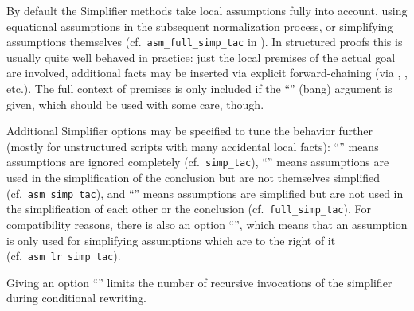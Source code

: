 \begin{isabellebody}
\begin{isamarkuptext}
\begin{descr}
  \end{descr}

  By default the Simplifier methods take local assumptions fully into
  account, using equational assumptions in the subsequent
  normalization process, or simplifying assumptions themselves (cf.\
  \verb|asm_full_simp_tac| in \cite[\S10]{isabelle-ref}).  In
  structured proofs this is usually quite well behaved in practice:
  just the local premises of the actual goal are involved, additional
  facts may be inserted via explicit forward-chaining (via \mbox{}, \mbox{}, \mbox{} etc.).  The full
  context of premises is only included if the ``\isa{{\isacharbang}}'' (bang)
  argument is given, which should be used with some care, though.

  Additional Simplifier options may be specified to tune the behavior
  further (mostly for unstructured scripts with many accidental local
  facts): ``'' means assumptions are ignored
  completely (cf.\ \verb|simp_tac|), ``'' means
  assumptions are used in the simplification of the conclusion but are
  not themselves simplified (cf.\ \verb|asm_simp_tac|), and ``'' means assumptions are simplified but are not used
  in the simplification of each other or the conclusion (cf.\ \verb|full_simp_tac|).  For compatibility reasons, there is also an option
  ``\isa{{\isacharparenleft}asm{\isacharunderscore}lr{\isacharparenright}}'', which means that an assumption is only used
  for simplifying assumptions which are to the right of it (cf.\ \verb|asm_lr_simp_tac|).

  Giving an option ``'' limits the number of
  recursive invocations of the simplifier during conditional
  rewriting.


\end{isamarkuptext}
\end{isabellebody}
